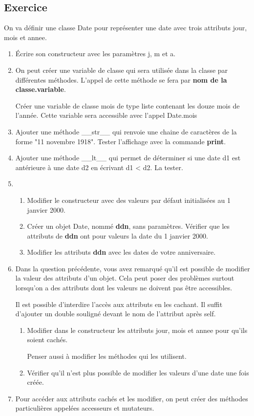 \documentclass[11pt,a4paper]{article}
\newcounter{numexo}
\begin{document}
\addtocounter{numexo}{1}
\subsection*{\Large Exercice \thenumexo}
On va définir une classe Date pour représenter une date avec trois attributs jour, mois et annee.
\begin{enumerate}
\item Écrire son constructeur avec les paramètres j, m et a.
\item On peut créer une variable de classe qui sera utilisée dans la classe par différentes méthodes. L'appel de cette méthode se fera par \textbf{nom de la classe.variable}.\medskip

Créer une variable de classe mois de type liste contenant les douze mois de l'année. Cette variable sera accessible  avec l'appel Date.mois
\item Ajouter une méthode \_\_str\_\_ qui renvoie une chaine de caractères de la forme "11 novembre 1918". Tester l'affichage avec la commande \textbf{print}.
\item Ajouter une méthode \_\_lt\_\_ qui permet de déterminer si une date d1 est antérieure à une date d2 en écrivant d1 < d2. La tester.
\item \begin{enumerate}
\item Modifier le constructeur avec des valeurs par défaut initialisées au 1 janvier 2000.
\item Créer un objet Date, nommé \textbf{ddn}, sans paramètres. Vérifier que les attributs de \textbf{ddn} ont pour valeurs la date du 1 janvier 2000.
\item Modifier les attributs \textbf{ddn} avec les dates de votre anniversaire.
\end{enumerate} 
\item Dans la question précédente, vous avez remarqué qu'il est possible de modifier la valeur des attributs d'un objet. Cela peut poser des problèmes surtout lorsqu'on a des attributs dont les valeurs ne doivent pas être accessibles.\medskip

Il est possible d'interdire l'accès aux attributs en les cachant. Il suffit d'ajouter un double souligné devant le nom de l'attribut après self.
\begin{enumerate}
\item Modifier dans le constructeur les attributs jour, mois et annee pour qu'ils soient cachés. 

Penser aussi à modifier les méthodes qui les utilisent.
\item Vérifier qu'il n'est plus possible de modifier les valeurs d'une date une fois créée.
\end{enumerate}
\item Pour accéder aux attributs cachés et les modifier, on peut créer des méthodes particulières appelées accesseurs et mutateurs.


\end{enumerate}
\end{document}
